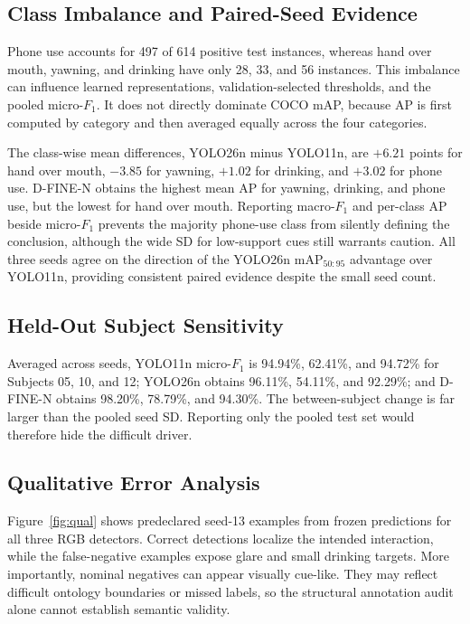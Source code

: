 \documentclass[conference]{IEEEtran}
\begin{document}
\subsection{Class Imbalance and Paired-Seed Evidence}
Phone use accounts for 497 of 614 positive test instances, whereas hand over mouth, yawning, and drinking have only 28, 33, and 56 instances. This imbalance can influence learned representations, validation-selected thresholds, and the pooled micro-$F_1$. It does not directly dominate COCO mAP, because AP is first computed by category and then averaged equally across the four categories.

The class-wise mean differences, YOLO26n minus YOLO11n, are $+6.21$ points for hand over mouth, $-3.85$ for yawning, $+1.02$ for drinking, and $+3.02$ for phone use. D-FINE-N obtains the highest mean AP for yawning, drinking, and phone use, but the lowest for hand over mouth. Reporting macro-$F_1$ and per-class AP beside micro-$F_1$ prevents the majority phone-use class from silently defining the conclusion, although the wide SD for low-support cues still warrants caution. All three seeds agree on the direction of the YOLO26n $\mathrm{mAP}_{50:95}$ advantage over YOLO11n, providing consistent paired evidence despite the small seed count.

\subsection{Held-Out Subject Sensitivity}
Averaged across seeds, YOLO11n micro-$F_1$ is 94.94\%, 62.41\%, and 94.72\% for Subjects 05, 10, and 12; YOLO26n obtains 96.11\%, 54.11\%, and 92.29\%; and D-FINE-N obtains 98.20\%, 78.79\%, and 94.30\%. The between-subject change is far larger than the pooled seed SD. Reporting only the pooled test set would therefore hide the difficult driver.

\subsection{Qualitative Error Analysis}
Figure~\ref{fig:qual} shows predeclared seed-13 examples from frozen predictions for all three RGB detectors. Correct detections localize the intended interaction, while the false-negative examples expose glare and small drinking targets. More importantly, nominal negatives can appear visually cue-like. They may reflect difficult ontology boundaries or missed labels, so the structural annotation audit alone cannot establish semantic validity.
\end{document}
